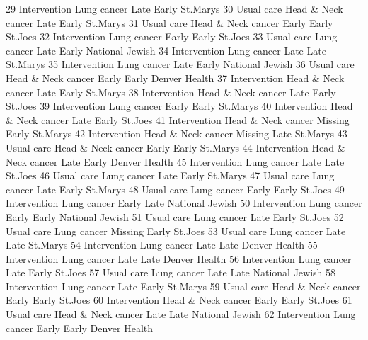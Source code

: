 \documentclass[
  letterpaper,
  DIV=11,
  numbers=noendperiod]{scrreprt}
\newenvironment{Shaded}{\begin{snugshade}}{\end{snugshade}}
\newcommand{\NormalTok}[1]{\textcolor[rgb]{0.00,0.23,0.31}{#1}}
\begin{document}
\begin{Shaded}
\begin{Highlighting}[]
\NormalTok{29  Intervention        Lung cancer    Late Early        St.Marys}
\NormalTok{30    Usual care Head \& Neck cancer    Late Early        St.Marys}
\NormalTok{31    Usual care Head \& Neck cancer   Early Early         St.Joes}
\NormalTok{32  Intervention        Lung cancer   Early Early         St.Joes}
\NormalTok{33    Usual care        Lung cancer    Late Early National Jewish}
\NormalTok{34  Intervention        Lung cancer    Late  Late        St.Marys}
\NormalTok{35  Intervention        Lung cancer    Late Early National Jewish}
\NormalTok{36    Usual care Head \& Neck cancer   Early Early   Denver Health}
\NormalTok{37  Intervention Head \& Neck cancer    Late Early        St.Marys}
\NormalTok{38  Intervention Head \& Neck cancer    Late Early         St.Joes}
\NormalTok{39  Intervention        Lung cancer   Early Early        St.Marys}
\NormalTok{40  Intervention Head \& Neck cancer    Late Early         St.Joes}
\NormalTok{41  Intervention Head \& Neck cancer Missing Early        St.Marys}
\NormalTok{42  Intervention Head \& Neck cancer Missing  Late        St.Marys}
\NormalTok{43    Usual care Head \& Neck cancer   Early Early        St.Marys}
\NormalTok{44  Intervention Head \& Neck cancer    Late Early   Denver Health}
\NormalTok{45  Intervention        Lung cancer    Late  Late         St.Joes}
\NormalTok{46    Usual care        Lung cancer    Late Early        St.Marys}
\NormalTok{47    Usual care        Lung cancer    Late Early        St.Marys}
\NormalTok{48    Usual care        Lung cancer   Early Early         St.Joes}
\NormalTok{49  Intervention        Lung cancer   Early  Late National Jewish}
\NormalTok{50  Intervention        Lung cancer   Early Early National Jewish}
\NormalTok{51    Usual care        Lung cancer    Late Early         St.Joes}
\NormalTok{52    Usual care        Lung cancer Missing Early         St.Joes}
\NormalTok{53    Usual care        Lung cancer    Late  Late        St.Marys}
\NormalTok{54  Intervention        Lung cancer    Late  Late   Denver Health}
\NormalTok{55  Intervention        Lung cancer    Late  Late   Denver Health}
\NormalTok{56  Intervention        Lung cancer    Late Early         St.Joes}
\NormalTok{57    Usual care        Lung cancer    Late  Late National Jewish}
\NormalTok{58  Intervention        Lung cancer    Late Early        St.Marys}
\NormalTok{59    Usual care Head \& Neck cancer   Early Early         St.Joes}
\NormalTok{60  Intervention Head \& Neck cancer   Early Early         St.Joes}
\NormalTok{61    Usual care Head \& Neck cancer    Late  Late National Jewish}
\NormalTok{62  Intervention        Lung cancer   Early Early   Denver Health}

\end{Highlighting}
\end{Shaded}
\end{document}

